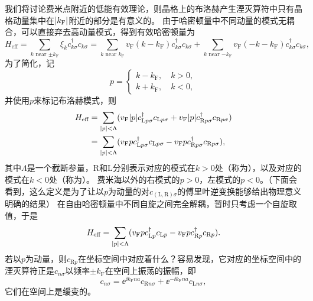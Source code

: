 我们将讨论费米点附近的低能有效理论，则晶格上的布洛赫产生湮灭算符中只有晶格动量集中在$\abs{k_\text{F}}$附近的部分是有意义的。
由于哈密顿量中不同动量的模式无耦合，可以直接弃去高动量模式，得到有效哈密顿量为
\[
    {H}_\text{eff} = \sum_{\text{$k$ near $\pm k_\text{F}$}} \xi_k {c}^\dagger_{k \sigma} {c}_{k \sigma} = \sum_{\text{$k$ near $k_\text{F}$}} v_\text{F} (k - k_\text{F}) {c}^\dagger_{k \sigma} {c}_{k \sigma} + \sum_{\text{$k$ near $-k_\text{F}$}} v_\text{F} ( - k - k_\text{F}) {c}^\dagger_{k \sigma} {c}_{k \sigma}  ,
\]
为了简化，记
\begin{equation}
    p = \begin{cases}
        k - k_\text{F}, \quad k > 0, \\
        k + k_\text{F} , \quad k < 0,
    \end{cases}
\end{equation}
并使用$p$来标记布洛赫模式，则
\begin{equation}
    \begin{aligned}
        {H}_\text{eff} &= \sum_{\abs{p} < \Lambda} (v_\text{F} \abs{p} {c}^\dagger_{ \text{L} p\sigma} {c}_{\text{L} p\sigma} + v_\text{F} \abs{p} {c}^\dagger_{ \text{R} p\sigma} {c}_{\text{R} p\sigma}) \\
        &= \sum_{\abs{p} < \Lambda} (v_\text{F} p {c}^\dagger_{ \text{L} p\sigma} {c}_{\text{L} p\sigma} - v_\text{F} p {c}^\dagger_{ \text{R} p\sigma} {c}_{\text{R} p\sigma}),
    \end{aligned}
\end{equation}
其中$\Lambda$是一个截断参量，R和L分别表示对应的模式在$k>0$处（称为），以及对应的模式在$k<0$处（称为）。
费米海以外的右模式的$p>0$，左模式的$p < 0$。（下面会看到，这么定义是为了让以$p$为动量的对${c}_{(\text{L}, \text{R}) \sigma}$的傅里叶逆变换能够给出物理意义明确的结果）
在自由哈密顿量中不同自旋之间完全解耦，暂时只考虑一个自旋取值，于是
\begin{equation}
    {H}_\text{eff} = \sum_{\abs{p} < \Lambda} (v_\text{F} p {c}^\dagger_{\text{L} p} {c}_{\text{L} p} - v_\text{F} p {c}^\dagger_{\text{R} p} {c}_{\text{R} p}).
    \label{eq:one-dimension-linear-model}
\end{equation}
若以$p$为动量，则${c}_{\text{R} p}$在坐标空间中对应着什么？容易发现，它对应的坐标空间中的湮灭算符正是${c}_{n\sigma}$以频率$\pm k_\text{F}$在空间上振荡的振幅，即
\begin{equation}
    {c}_{n\sigma} = \ee^{\ii k_\text{F} na} {c}_{\text{R} n \sigma } + \ee^{ - \ii k_\text{F} na} {c}_{\text{L} n \sigma},
\end{equation}
它们在空间上是缓变的。%


